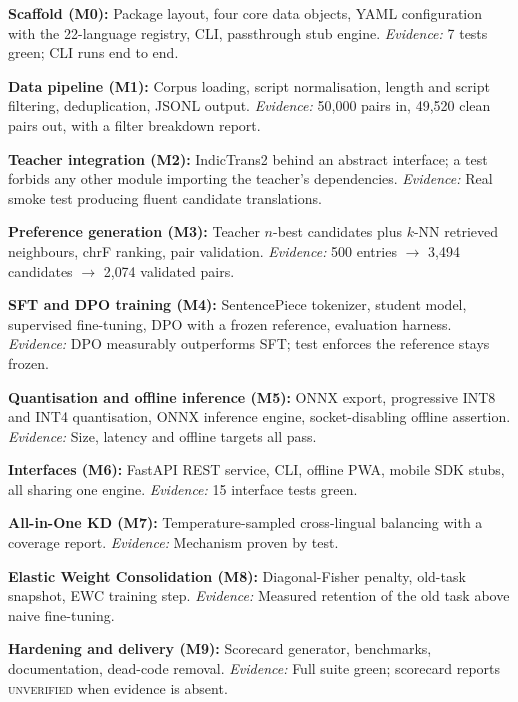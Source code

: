 \begin{bullets}
\item \textbf{Scaffold (M0):} Package layout, four core data objects, YAML configuration with the 22-language registry, CLI, passthrough stub engine. \emph{Evidence:} 7 tests green; CLI runs end to end.
\item \textbf{Data pipeline (M1):} Corpus loading, script normalisation, length and script filtering, deduplication, JSONL output. \emph{Evidence:} 50{,}000 pairs in, 49{,}520 clean pairs out, with a filter breakdown report.
\item \textbf{Teacher integration (M2):} IndicTrans2 behind an abstract interface; a test forbids any other module importing the teacher's dependencies. \emph{Evidence:} Real smoke test producing fluent candidate translations.
\item \textbf{Preference generation (M3):} Teacher $n$-best candidates plus $k$-NN retrieved neighbours, chrF ranking, pair validation. \emph{Evidence:} 500 entries $\rightarrow$ 3{,}494 candidates $\rightarrow$ 2{,}074 validated pairs.
\item \textbf{SFT and DPO training (M4):} SentencePiece tokenizer, student model, supervised fine-tuning, DPO with a frozen reference, evaluation harness. \emph{Evidence:} DPO measurably outperforms SFT; test enforces the reference stays frozen.
\item \textbf{Quantisation and offline inference (M5):} ONNX export, progressive INT8 and INT4 quantisation, ONNX inference engine, socket-disabling offline assertion. \emph{Evidence:} Size, latency and offline targets all pass.
\item \textbf{Interfaces (M6):} FastAPI REST service, CLI, offline PWA, mobile SDK stubs, all sharing one engine. \emph{Evidence:} 15 interface tests green.
\item \textbf{All-in-One KD (M7):} Temperature-sampled cross-lingual balancing with a coverage report. \emph{Evidence:} Mechanism proven by test.
\item \textbf{Elastic Weight Consolidation (M8):} Diagonal-Fisher penalty, old-task snapshot, EWC training step. \emph{Evidence:} Measured retention of the old task above naive fine-tuning.
\item \textbf{Hardening and delivery (M9):} Scorecard generator, benchmarks, documentation, dead-code removal. \emph{Evidence:} Full suite green; scorecard reports \textsc{unverified} when evidence is absent.
\end{bullets}

